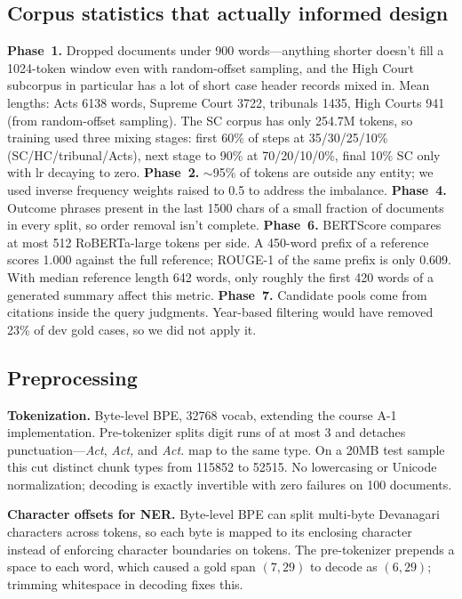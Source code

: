 \documentclass[11pt, oneside]{article}
\begin{document}
\subsection{Corpus statistics that actually informed design}
\label{sec:stats}
\textbf{Phase~1.} Dropped documents under 900 words---anything shorter doesn't fill a 1024-token
window even with random-offset sampling, and the High Court subcorpus in particular has a lot of short
case header records mixed in. Mean lengths: Acts 6138 words, Supreme Court 3722, tribunals 1435, High
Courts 941 (from random-offset sampling). The SC corpus has only 254.7M tokens, so training used three
mixing stages: first 60\% of steps at 35/30/25/10\% (SC/HC/tribunal/Acts), next stage to 90\% at
70/20/10/0\%, final 10\% SC only with lr decaying to zero.
\textbf{Phase~2.} $\sim$95\% of tokens are outside any entity; we used inverse frequency weights raised
to 0.5 to address the imbalance.
\textbf{Phase~4.} Outcome phrases present in the last 1500 chars of a small fraction of documents in
every split, so order removal isn't complete.
\textbf{Phase~6.} BERTScore compares at most 512 RoBERTa-large tokens per side. A 450-word prefix of a
reference scores 1.000 against the full reference; ROUGE-1 of the same prefix is only 0.609. With median
reference length 642 words, only roughly the first 420 words of a generated summary affect this metric.
\textbf{Phase~7.} Candidate pools come from citations inside the query judgments. Year-based filtering
would have removed 23\% of dev gold cases, so we did not apply it.

\subsection{Preprocessing}
\label{sec:prep}
\textbf{Tokenization.} Byte-level BPE, 32768 vocab, extending the course A-1 implementation.
Pre-tokenizer splits digit runs of at most 3 and detaches punctuation---\emph{Act}, \emph{Act,} and
\emph{Act.} map to the same type. On a 20MB test sample this cut distinct chunk types from 115852 to
52515. No lowercasing or Unicode normalization; decoding is exactly invertible with zero failures on
100 documents.

\textbf{Character offsets for NER.} Byte-level BPE can split multi-byte Devanagari characters across
tokens, so each byte is mapped to its enclosing character instead of enforcing character boundaries on
tokens. The pre-tokenizer prepends a space to each word, which caused a gold span $(7, 29)$ to decode as
$(6, 29)$; trimming whitespace in decoding fixes this.
\end{document}
